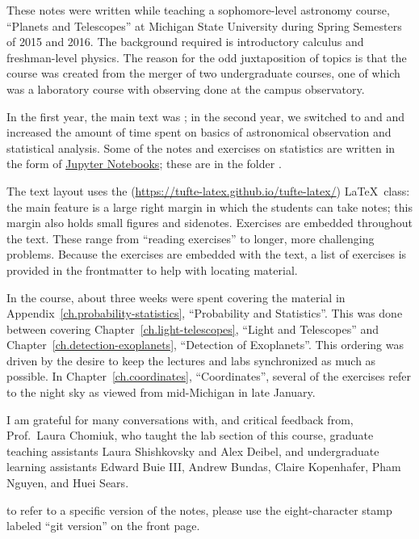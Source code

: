 
These notes were written while teaching a sophomore-level astronomy course, ``Planets and Telescopes'' at Michigan State University during Spring Semesters of 2015 and 2016. The background required is  introductory calculus and freshman-level physics. The reason for the odd juxtaposition of topics is that the course was created from the merger of two undergraduate courses, one of which was a laboratory course with observing done at the campus observatory.

In the first year, the main text was ; in the second year, we switched to  and  and increased the amount of time spent on basics of astronomical observation and statistical analysis. Some of the notes and exercises on statistics are written in the form of \href{http://jupyter.org}{Jupyter Notebooks}; these are in the folder .

The text layout uses the  (\url{https://tufte-latex.github.io/tufte-latex/}) \LaTeX\ class:  the main feature is a large right margin in which the students can take notes; this margin also holds small figures and sidenotes. Exercises are embedded throughout the text.  These range from ``reading exercises'' to longer, more challenging problems.  Because the exercises are embedded with the text, a list of exercises is provided in the frontmatter to help with locating material.

In the course, about three weeks were spent covering the material in Appendix~\ref{ch.probability-statistics}, ``Probability and Statistics''.  This was done between covering Chapter~\ref{ch.light-telescopes}, ``Light and Telescopes'' and Chapter~\ref{ch.detection-exoplanets}, ``Detection of Exoplanets''.  This ordering was driven by the desire to keep the lectures and labs synchronized as much as possible. In Chapter~\ref{ch.coordinates}, ``Coordinates'', several of the exercises refer to the night sky as viewed from mid-Michigan in late January.

I am grateful for many conversations with, and critical feedback from,  Prof.~Laura Chomiuk, who taught the lab section of this course, graduate teaching assistants Laura Shishkovsky and Alex Deibel, and undergraduate learning assistants Edward Buie III, Andrew Bundas, Claire Kopenhafer, Pham Nguyen, and Huei Sears. 

 to refer to a specific version of the notes, please use the eight-character stamp labeled ``git version'' on the front page.
